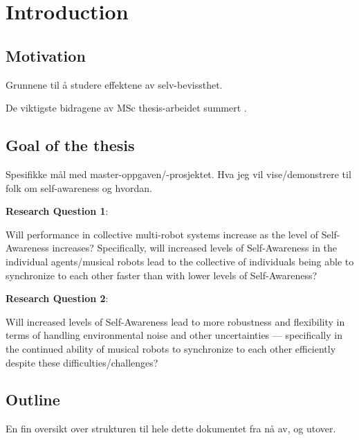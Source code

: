 \chapter{Introduction}
\label{chap:introduction}
	
	
	
	
	
	
	
	
	\section{Motivation}
	
	Grunnene til å studere effektene av selv-bevissthet.
	\nl
	
	De viktigste bidragene av MSc thesis-arbeidet summert .
	
	
	
	
	
	
	
	
	
	\section{Goal of the thesis}
	
	Spesifikke mål  med master-oppgaven/-prosjektet. Hva jeg vil vise/demonstrere til folk  om self-awareness  og hvordan.
	\nl
	
	\textbf{Research Question 1}:
	
	Will performance in collective multi-robot systems increase as the level of Self-Awareness increases? Specifically, will increased levels of Self-Awareness in the individual agents/musical robots lead to the collective of individuals being able to synchronize to each other faster than with lower levels of Self-Awareness? \nl
	
	\textbf{Research Question 2}:
	
	Will increased levels of Self-Awareness lead to more robustness and flexibility in terms of handling environmental noise and other uncertainties — specifically in the continued ability of musical robots to synchronize to each other efficiently despite these difficulties/challenges? \nl
	
	
	
	
	
	
	
	\section{Outline}
	En fin  oversikt over strukturen til hele dette dokumentet fra nå av, og utover.
